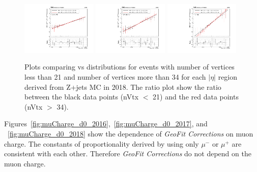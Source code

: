 \begin{figure}[h!]
    \centering
    \includegraphics[width=0.32\textwidth]{images_geofit/nVtx_eta_0_0p9_2018.pdf}
    \includegraphics[width=0.32\textwidth]{images_geofit/nVtx_eta_0p9_1p7_2018.pdf}
    \includegraphics[width=0.32\textwidth]{images_geofit/nVtx_eta_1p7_inf_2018.pdf}
    \caption{Plots comparing \dptoverptsquare vs \dzeroBS distributions for events with number of vertices less than 21 and number of vertices more than 34 for each $|\eta|$ region derived from Z+jets MC in 2018. The ratio plot show the ratio between the black data points (nVtx $<$ 21) and the red data points (nVtx $>$ 34).}
    \label{fig:nVtx_d0_2018}
\end{figure}

Figures~\ref{fig:muCharge_d0_2016},~\ref{fig:muCharge_d0_2017}, and ~\ref{fig:muCharge_d0_2018} show the dependence of \textit{GeoFit Corrections} on muon charge. The constants of proportionality derived by using only $\mu^-$ or $\mu^+$ are consistent with each other. Therefore \textit{GeoFit Corrections} do not depend on the muon charge.

